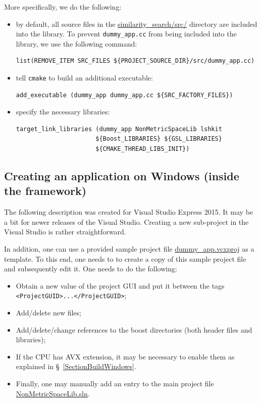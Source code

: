 \documentclass[runningheads,a4paper]{llncs}
\newcommand{\replocfile}{https://github.com/searchivarius/NonMetricSpaceLib/blob/develop/}
\newcommand{\ttt}[1]{\texttt{#1}}
\begin{document}
More specifically, we do the following:
\begin{itemize}
\item by default, all source files in the  
\href{\replocfile similarity_search/src/}{similarity\_search/src/} directory are included into the library.
To prevent \ttt{dummy\_app.cc} from being included into the library, we use the following command:
\begin{verbatim}
list(REMOVE_ITEM SRC_FILES ${PROJECT_SOURCE_DIR}/src/dummy_app.cc)
\end{verbatim}

\item tell \ttt{cmake} to build an additional executable:
\begin{verbatim}
add_executable (dummy_app dummy_app.cc ${SRC_FACTORY_FILES})
\end{verbatim}

\item specify the necessary libraries:
\begin{verbatim}
target_link_libraries (dummy_app NonMetricSpaceLib lshkit 
                      ${Boost_LIBRARIES} ${GSL_LIBRARIES} 
                      ${CMAKE_THREAD_LIBS_INIT})
\end{verbatim}
\end{itemize}

\subsection{Creating an application on Windows (inside the framework)}\label{SectionCreateAppWindows}
The following description was created for Visual Studio Express 2015.
It may be a bit for newer releases of the Visual Studio.
Creating a new sub-project in the Visual Studio is rather straightforward.

In addition, one can use a provided sample project file \href{\replocfile similarity_search/src/dummy_app.vcxproj}{dummy\_app.vcxproj} as a template.
To this end, one needs to to create a copy of this sample project file and subsequently edit it. 
One needs to do the following:
\begin{itemize}
\item Obtain a new value of the project GUI and put it between the tags \newline \ttt{<ProjectGUID>...</ProjectGUID>};
\item Add/delete new files; 
\item Add/delete/change references to the boost directories (both header files and libraries);
\item If the CPU has AVX extension, it may be necessary to enable them
as explained in \S~\ref{SectionBuildWindows}.
\item Finally, one may manually add an entry to the main project
file \href{\replocfile similarity_search/NonMetricSpaceLib.sln}{NonMetricSpaceLib.sln}.
\end{itemize}
\end{document}
